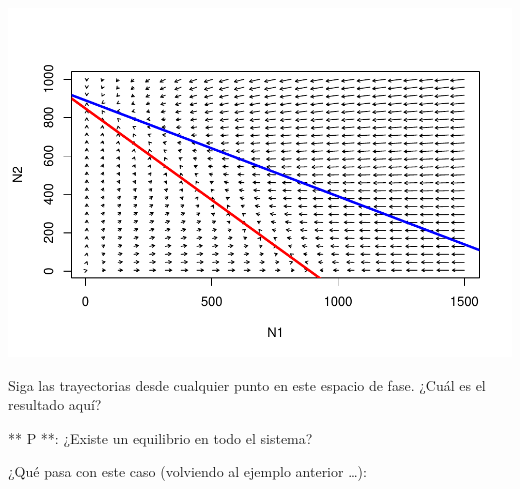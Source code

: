 \documentclass[
]{article}
\begin{document}
\includegraphics{LECTURE16_files/figure-latex/unnamed-chunk-14-1.pdf}

Siga las trayectorias desde cualquier punto en este espacio de fase.
¿Cuál es el resultado aquí?

** P **: ¿Existe un equilibrio en todo el sistema?

¿Qué pasa con este caso (volviendo al ejemplo anterior \ldots):
\end{document}
